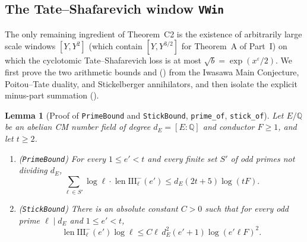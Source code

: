 \documentclass[11pt]{amsart}
\newcommand{\Q}{\mathbb{Q}}
\newcommand{\eps}{\varepsilon}
\newcommand{\Sha}{\mathrm{III}}
\DeclareMathOperator{\len}{len}
\theoremstyle{plain}
\newtheorem{lemma}[theorem]{Lemma}
\theoremstyle{definition}
\numberwithin{equation}{section}
\begin{document}
\subsection{The Tate--Shafarevich window \texttt{VWin}}

The only remaining ingredient of Theorem~C2 is the existence of arbitrarily large scale windows
$[Y,Y^2]$ (which contain $[Y,Y^{3/2}]$ for Theorem~A of Part~I) on which the cyclotomic
Tate--Shafarevich loss is at most $\sqrt{b}=\exp(x^\eps/2)$. We first prove the two arithmetic
bounds  and  () from the
Iwasawa Main Conjecture, Poitou--Tate duality, and Stickelberger annihilators, and then isolate
the explicit minus-part summation ().

\begin{lemma}[Proof of \texttt{PrimeBound} and \texttt{StickBound}, \texttt{prime\_of}, \texttt{stick\_of}]\label{lem:primeStick}
Let $E/\Q$ be an abelian CM number field of degree $d_E=[E:\Q]$ and conductor $F\ge 1$, and let
$t\ge 2$.
\begin{enumerate}[label=(\roman*)]
\item \textup{(\texttt{PrimeBound})} For every $1\le e'<t$ and every finite set $S'$ of odd primes
  not dividing $d_E$,
  \[
  \sum_{\ell\in S'}\log\ell\cdot\len\Sha_\ell^-(e')\le d_E(2t+5)\log(tF).
  \]
\item \textup{(\texttt{StickBound})} There is an absolute constant $C>0$ such that for every odd
  prime $\ell\mid d_E$ and $1\le e'<t$,
  \[
  \len\Sha_\ell^-(e')\log\ell\le C\ell\,d_E^2(e'+1)\log(e'\ell F)^2.
  \]
\end{enumerate}
\end{lemma}
\end{document}
